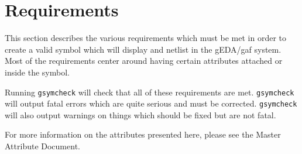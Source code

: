 \documentclass{article}
\begin{document}
\section{Requirements}

This section describes the various requirements which must be met in order
to create a valid symbol which will display and netlist in the gEDA/gaf
system.  Most of the requirements center around having certain attributes
attached or inside the symbol.  

Running {\tt gsymcheck} will check that all of these requirements are met.
{\tt gsymcheck} will output fatal errors which are quite serious and must
be corrected.  {\tt gsymcheck} will also output warnings on things which
should be fixed but are not fatal.  

For more information on the attributes presented here, please see the
Master Attribute Document.
\end{document}
